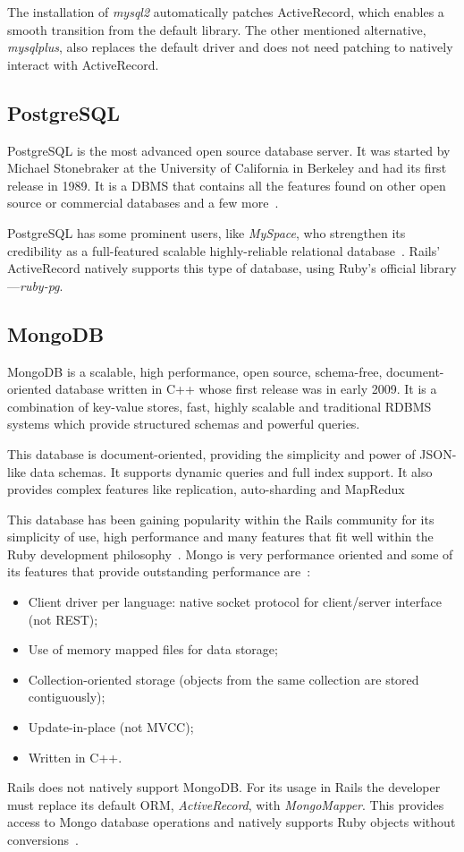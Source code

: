 The installation of \textit{mysql2} automatically patches ActiveRecord, which enables a smooth transition from the default library. The other mentioned alternative, \textit{mysqlplus}, also replaces the default driver and does not need patching to natively interact with ActiveRecord.


\subsection{PostgreSQL}
PostgreSQL is the most advanced open source database server. It was started by Michael Stonebraker at the University of California in Berkeley and had its first release in 1989. It is a DBMS that contains all the features found on other open source or commercial databases and a few more~\cite{beginning_postgresql}.

PostgreSQL has some prominent users, like \textit{MySpace}, who strengthen its credibility as a full-featured scalable highly-reliable relational database~\cite{petabyte_warehouses}. Rails' ActiveRecord natively supports this type of database, using Ruby's official library---\textit{ruby-pg}.


\subsection{MongoDB}
MongoDB is a scalable, high performance, open source, schema-free, document-oriented database written in C++ whose first release was in early 2009. It is a combination of key-value stores, fast, highly scalable and traditional RDBMS systems which provide structured schemas and powerful queries.

This database is document-oriented, providing the simplicity and power of JSON-like data schemas. It supports dynamic queries and full index support. It also provides complex features like replication, auto-sharding and MapRedux~\cite{mongodb}

This database has been gaining popularity within the Rails community for its simplicity of use, high performance and many features that fit well within the Ruby development philosophy~\cite{mongodb_rails}. Mongo is very performance oriented and some of its features that provide outstanding performance are~\cite{mongodb_couchdb}:
\begin{itemize}
  \item Client driver per language: native socket protocol for client/server interface (not REST);
  \item Use of memory mapped files for data storage;
  \item Collection-oriented storage (objects from the same collection are stored contiguously);
  \item Update-in-place (not MVCC);
  \item Written in C++.
\end{itemize}
Rails does not natively support MongoDB. For its usage in Rails the developer must replace its default ORM, \textit{ActiveRecord}, with \textit{MongoMapper}. This provides access to Mongo database operations and natively supports Ruby objects without conversions~\cite{mongomapper}.



